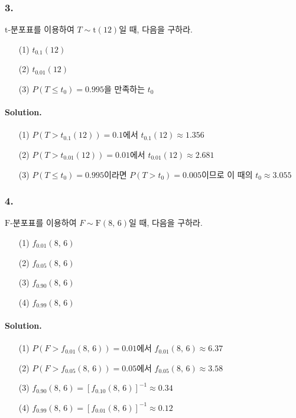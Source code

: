 \subsubsection{3.} $\mathrm{t}$-분포표를 이용하여 $T\sim \mathrm{t}\left(12\right)$일 때, 다음을 구하라.

\begin{itemize}
	\item [(1)] $t_{0.1}\left(12\right)$
	\item [(2)] $t_{0.01}\left(12\right)$
	\item [(3)] $P\left(T\leq t_0\right)=0.995$을 만족하는 $t_0$
\end{itemize}

\paragraph{Solution.}

\begin{itemize}
	\item [(1)] $P\left(T>t_{0.1}\left(12\right)\right) = 0.1$에서 $t_{0.1}\left(12\right) \approx 1.356$
	\item [(2)] $P\left(T>t_{0.01}\left(12\right)\right) = 0.01$에서 $t_{0.01}\left(12\right) \approx 2.681$
	\item [(3)] $P\left(T\leq t_0\right)=0.995$이라면 $P\left(T>t_0\right)=0.005$이므로 이 때의 $t_0 \approx 3.055$
\end{itemize}

\subsubsection{4.} $\mathrm{F}$-분포표를 이용하여 $F\sim \mathrm{F}\left(8,\,6\right)$일 때, 다음을 구하라.

\begin{itemize}
	\item [(1)] $f_{0.01}\left(8,\,6\right)$
	\item [(2)] $f_{0.05}\left(8,\,6\right)$
	\item [(3)] $f_{0.90}\left(8,\,6\right)$
	\item [(4)] $f_{0.99}\left(8,\,6\right)$
\end{itemize}

\paragraph{Solution.}

\begin{itemize}
	\item [(1)] $P\left(F>f_{0.01}\left(8,\,6\right)\right)=0.01$에서 $f_{0.01}\left(8,\,6\right)\approx 6.37$
	\item [(2)] $P\left(F>f_{0.05}\left(8,\,6\right)\right)=0.05$에서 $f_{0.05}\left(8,\,6\right)\approx 3.58$
	\item [(3)] $f_{0.90}\left(8,\,6\right)=\left[f_{0.10}\left(8,\,6\right)\right]^{-1}\approx 0.34$
	\item [(4)] $f_{0.99}\left(8,\,6\right)=\left[f_{0.01}\left(8,\,6\right)\right]^{-1}\approx 0.12$
\end{itemize}

